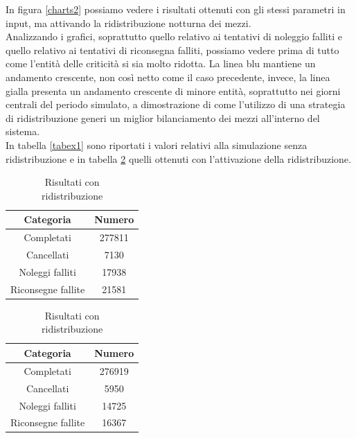 \documentclass[a4paper, 12pt]{article}
\begin{document}
In figura \ref{charts2} possiamo vedere i risultati ottenuti con gli stessi parametri in input, ma attivando la ridistribuzione notturna dei mezzi.\\
Analizzando i grafici, soprattutto quello relativo ai tentativi di noleggio falliti e quello relativo ai tentativi di riconsegna falliti, possiamo vedere prima di tutto come l'entità delle criticità si sia molto ridotta. La linea blu mantiene un andamento crescente, non così netto come il caso precedente, invece, la linea gialla presenta un andamento crescente di minore entità, soprattutto nei giorni centrali del periodo simulato, a dimostrazione di come l'utilizzo di una strategia di ridistribuzione generi un miglior bilanciamento dei mezzi all'interno del sistema.\\
In tabella \ref{tabex1} sono riportati i valori relativi alla simulazione senza ridistribuzione e in tabella \ref{tabex2} quelli ottenuti con l'attivazione della ridistribuzione.\\
	\begin{table}[!htb]
	\begin{minipage}{0.45\linewidth}
	    \centering
	    \caption{Risultati senza\\ ridistribuzione}
	    \label{tabex1}
	\begin{tabular}{| c | c |} 
	 \hline
	 \textbf{Categoria} & \textbf{Numero} \\ [0.5ex] 
	\hline
	 \hline
	 Completati & 277811 \\
	 \hline
	 Cancellati & 7130 \\  
	 \hline
	 Noleggi falliti & 17938 \\
	 \hline
	 Riconsegne fallite & 21581 \\
	 \hline
	\end{tabular}
	\end{minipage}\hfill
	\begin{minipage}{0.45\linewidth}
	    \centering
	    \caption{Risultati con\\ ridistribuzione}
	    \label{tabex2}
	\begin{tabular}{| c | c |} 
	 \hline
	 \textbf{Categoria} & \textbf{Numero} \\ [0.5ex] 
	\hline
	 \hline
	 Completati & 276919 \\
	 \hline
	 Cancellati & 5950 \\  
	 \hline
	 Noleggi falliti & 14725 \\
	 \hline
	 Riconsegne fallite & 16367 \\
	 \hline
	\end{tabular}
	\end{minipage}
	\end{table}\\
\end{document}
